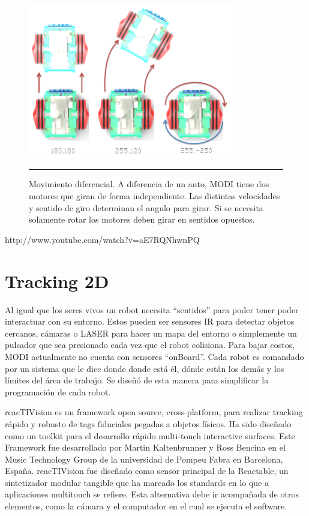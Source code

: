 \begin{figure}[htbp]
	\centering
		\includegraphics[width=0.8\textwidth]{./Figures/MODI/pwm.png}
		\rule{35em}{0.5pt}
	\caption[pwm]{Movimiento diferencial. A diferencia de un auto, MODI tiene dos motores que giran de forma independiente. Las distintas velocidades y sentido de giro determinan el angulo para girar. Si se necesita solamente rotar los motores deben girar en sentidos opuestos.}
	\label{fig:pwm}
\end{figure}



http://www.youtube.com/watch?v=aE7RQNhwnPQ



\section{Tracking 2D}

Al igual que los seres vivos un robot necesita “sentidos” para poder tener poder interactuar con su entorno. Estos pueden ser sensores IR para detectar objetos cercanos, cámaras o LASER para hacer un mapa del entorno o simplemente un pulsador que sea presionado cada vez que el robot colisiona. Para bajar costos, MODI actualmente no cuenta con sensores “onBoard”. Cada robot es comandado por un sistema que le dice donde donde está él, dónde están los demás y los límites del área de trabajo. Se diseñó de esta manera para simplificar la programación de cada robot.

reacTIVision es un framework open source, cross-platform, para realizar tracking rápido y robusto de tags fiduciales pegadas a objetos físicos. Ha sido diseñado como un toolkit para el desarrollo rápido multi-touch interactive surfaces. Este Framework fue desarrollado por Martin Kaltenbrunner y Ross Bencina en el Music Technology Group de la universidad de Pompeu Fabra en Barcelona, España. reacTIVision fue diseñado como sensor principal de la Reactable, un sintetizador modular tangible que ha marcado los standards en lo que a aplicaciones multitouch se refiere. Esta alternativa debe ir acompañada de otros elementos, como la cámara y el computador en el cual se ejecuta el software. 


